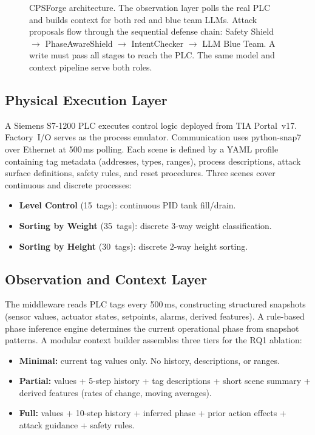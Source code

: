 \begin{figure}[t]
\begin{tikzpicture}
    \end{tikzpicture}
    \caption{CPSForge architecture. The observation layer polls the real PLC and builds context for both red and blue team LLMs. Attack proposals flow through the sequential defense chain: Safety Shield $\to$ PhaseAwareShield $\to$ IntentChecker $\to$ LLM Blue Team. A write must pass all stages to reach the PLC. The same model and context pipeline serve both roles.}
    \label{fig:architecture}
\end{figure}

\subsection{Physical Execution Layer}

A Siemens S7-1200 PLC executes control logic deployed from TIA Portal~v17. Factory~I/O serves as the process emulator. Communication uses python-snap7 over Ethernet at 500\,ms polling. Each scene is defined by a YAML profile containing tag metadata (addresses, types, ranges), process descriptions, attack surface definitions, safety rules, and reset procedures. Three scenes cover continuous and discrete processes:

\begin{itemize}[leftmargin=1.2em,nosep]
    \item \textbf{Level Control} (15~tags): continuous PID tank fill/drain.
    \item \textbf{Sorting by Weight} (35~tags): discrete 3-way weight classification.
    \item \textbf{Sorting by Height} (30~tags): discrete 2-way height sorting.
\end{itemize}

\subsection{Observation and Context Layer}
\label{sec:design:context}

The middleware reads PLC tags every 500\,ms, constructing structured snapshots (sensor values, actuator states, setpoints, alarms, derived features). A rule-based phase inference engine determines the current operational phase from snapshot patterns. A modular context builder assembles three tiers for the RQ1 ablation:

\begin{itemize}[leftmargin=1.2em,nosep]
    \item \textbf{Minimal:} current tag values only. No history, descriptions, or ranges.
    \item \textbf{Partial:} values + 5-step history + tag descriptions + short scene summary + derived features (rates of change, moving averages).
    \item \textbf{Full:} values + 10-step history + inferred phase + prior action effects + attack guidance + safety rules.
\end{itemize}

